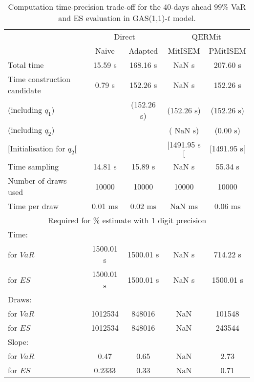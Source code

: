 { \renewcommand{\arraystretch}{1.3} 
\begin{table}[h] 
\centering 
\caption{Computation time-precision trade-off for the 40-days ahead  $99\%$ VaR and ES evaluation in GAS(1,1)-$t$ model.} 
\label{tab:time_precision_t_gas} 
\begin{tabular}{lcccc}  
  & \multicolumn{2}{c}{Direct} & \multicolumn{2}{c}{QERMit}  \\ \cline{2-5} 
  & Naive & Adapted & MitISEM & PMitISEM  \\ \hline 
Total time & 15.59 s & 168.16 s &  NaN s & 207.60 s \\ 
Time construction candidate & 0.79 s & 152.26 s &  NaN s & 152.26 s \\ 
 (including $q_{1}$) &   &  (152.26 s) & (152.26 s) & (152.26 s) \\ 
 (including $q_{2}$) &   &  & ( NaN s) & (0.00 s) \\ 
$[$Initialisation for $q_{2}$$[$&   &   & $[$1491.95 s$[$ & $[$1491.95 s$[$\\ 
Time sampling & 14.81 s & 15.89 s &  NaN s & 55.34 s  \\  
Number of draws used & 10000 & 10000 & 10000 & 10000 \\ 
Time per draw & 0.01 ms & 0.02 ms &  NaN ms & 0.06 ms \\ \hline 
\multicolumn{5}{c}{Required for \% estimate with 1 digit precision} \\ \hline 
Time: &  &  &   &  \\ 
\hspace{1cm} for $VaR$ & 1500.01 s & 1500.01 s &  NaN s & 714.22 s \\ 
\hspace{1cm} for $ES$ & 1500.01 s & 1500.01 s &  NaN s & 1500.01 s \\ 
Draws: &  &  &   &  \\ 
\hspace{1cm} for $VaR$ & 1012534 & 848016  &    NaN  & 101548  \\ 
\hspace{1cm} for $ES$ & 1012534 & 848016  &    NaN   & 243544  \\ 
\hline 
Slope: &  &  &   &  \\ 
\hspace{1cm} for $VaR$ & 0.47 & 0.65  &  NaN  & 2.73  \\ 
\hspace{1cm} for $ES$ & 0.2333 & 0.33  &  NaN   & 0.71  \\  \hline 
\end{tabular} 
\end{table} 
} 
